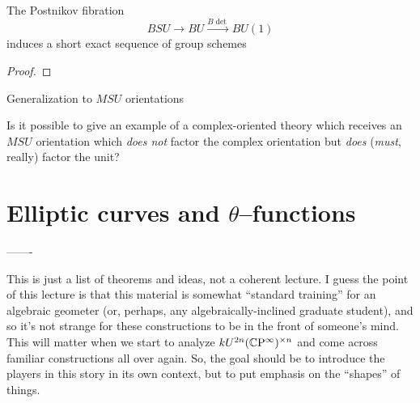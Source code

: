 


\begin{lemma}
The Postnikov fibration \[BSU \to BU \xrightarrow{B\det} BU(1)\] induces a short exact sequence of group schemes
\begin{center}
\end{center}
\end{lemma}
\begin{proof}
\end{proof}

Generalization to $MSU$ orientations

Is it possible to give an example of a complex-oriented theory which receives an $MSU$ orientation which \emph{does not} factor the complex orientation but \emph{does} (\emph{must}, really) factor the unit?







\section{Elliptic curves and $\theta$--functions}


-------

This is just a list of theorems and ideas, not a coherent lecture.  I guess the point of this lecture is that this material is somewhat ``standard training'' for an algebraic geometer (or, perhaps, any algebraically-inclined graduate student), and so it's not strange for these constructions to be in the front of someone's mind.  This will matter when we start to analyze $kU^{2n}(\mathbb{C}\mathrm P^\infty)^{\times n}$ and come across familiar constructions all over again.  So, the goal should be to introduce the players in this story in its own context, but to put emphasis on the ``shapes'' of things.

